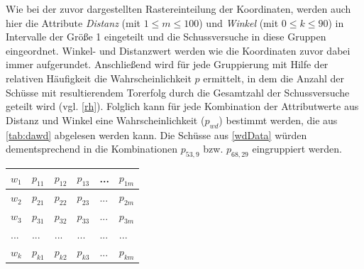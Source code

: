 Wie bei der zuvor dargestellten Rastereinteilung der Koordinaten, werden auch hier die Attribute \textit{Distanz} (mit $1 \le m \le 100$) und \textit{Winkel} (mit $0 \le k \le 90$) in Intervalle der Größe 1 eingeteilt und die Schussversuche in diese Gruppen eingeordnet. Winkel- und Distanzwert werden wie die Koordinaten zuvor dabei immer aufgerundet. Anschließend wird für jede Gruppierung mit Hilfe der relativen Häufigkeit die Wahrscheinlichkeit $p$ ermittelt, in dem die Anzahl der Schüsse mit resultierendem Torerfolg durch die Gesamtzahl der Schussversuche geteilt wird (vgl. \vref{rh}). Folglich kann für jede Kombination der Attributwerte aus Distanz und Winkel eine Wahrscheinlichkeit ($p_{wd}$) bestimmt werden, die aus \vref{tab:dawd} abgelesen werden kann. Die Schüsse aus \vref{wdData} würden dementsprechend in die Kombinationen $p_{53,9}$ bzw. $p_{68,29}$ eingruppiert werden.


\tablelasttail{}
\begin{center}%
\begin{supertabular}{ | P{3.2cm} | P{1.5cm} | P{1.5cm} | P{1.5cm} | P{1.5cm} |  P{1.5cm} |}
\textsf{$w_1$}	&   $p_{11}$	& 	$p_{12}$  &  $p_{13}$  &  ... &  $p_{1m}$\\
\hline
\textsf{$w_2$}	&   $p_{21}$	& 	$p_{22}$  &  $p_{23}$  &  ... &  $p_{2m}$\\
\hline
\textsf{$w_3$}	&   $p_{31}$	& 	$p_{32}$  &  $p_{33}$  &  ... &  $p_{3m}$\\
\hline
\textsf{...}	&   ...	        & 	...       &  ...        &  ... & ...\\
\hline
\textsf{$w_k$}	&   $p_{k1}$	& 	$p_{k2}$  &  $p_{k3}$  &  ... &  $p_{km	}$\\
\hline
\end{supertabular}
\end{center}






